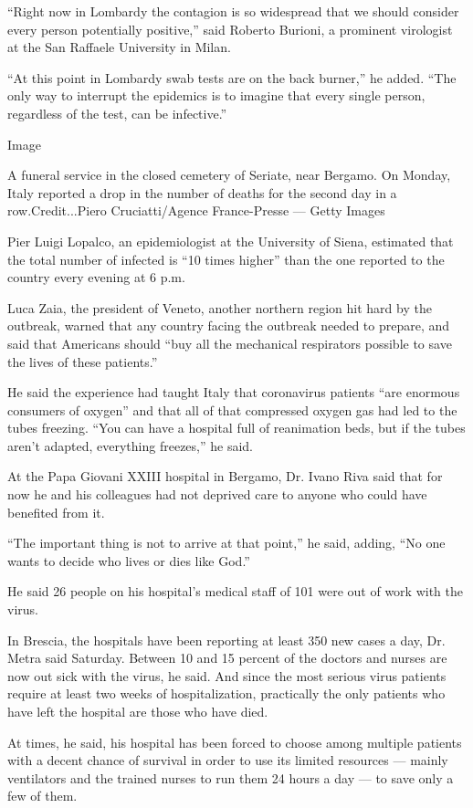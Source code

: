 ``Right now in Lombardy the contagion is so widespread that we should
consider every person potentially positive,'' said Roberto Burioni, a
prominent virologist at the San Raffaele University in Milan.

``At this point in Lombardy swab tests are on the back burner,'' he
added. ``The only way to interrupt the epidemics is to imagine that
every single person, regardless of the test, can be infective.''

Image

A funeral service in the closed cemetery of Seriate, near Bergamo. On
Monday, Italy reported a drop in the number of deaths for the second day
in a row.Credit...Piero Cruciatti/Agence France-Presse --- Getty Images

Pier Luigi Lopalco, an epidemiologist at the University of Siena,
estimated that the total number of infected is ``10 times higher'' than
the one reported to the country every evening at 6 p.m.

Luca Zaia, the president of Veneto, another northern region hit hard by
the outbreak, warned that any country facing the outbreak needed to
prepare, and said that Americans should ``buy all the mechanical
respirators possible to save the lives of these patients.''

He said the experience had taught Italy that coronavirus patients ``are
enormous consumers of oxygen'' and that all of that compressed oxygen
gas had led to the tubes freezing. ``You can have a hospital full of
reanimation beds, but if the tubes aren't adapted, everything freezes,''
he said.

At the Papa Giovani XXIII hospital in Bergamo, Dr. Ivano Riva said that
for now he and his colleagues had not deprived care to anyone who could
have benefited from it.

``The important thing is not to arrive at that point,'' he said, adding,
``No one wants to decide who lives or dies like God.''

He said 26 people on his hospital's medical staff of 101 were out of
work with the virus.

In Brescia, the hospitals have been reporting at least 350 new cases a
day, Dr. Metra said Saturday. Between 10 and 15 percent of the doctors
and nurses are now out sick with the virus, he said. And since the most
serious virus patients require at least two weeks of hospitalization,
practically the only patients who have left the hospital are those who
have died.

At times, he said, his hospital has been forced to choose among multiple
patients with a decent chance of survival in order to use its limited
resources --- mainly ventilators and the trained nurses to run them 24
hours a day --- to save only a few of them.

